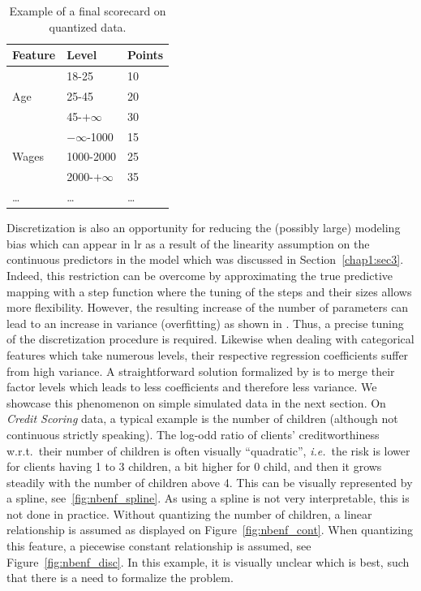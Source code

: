 \begin{table}
\centering
\caption{\label{tab:ex_scorecard} Example of a final scorecard on quantized data.}
\begin{tabular}{p{3cm}|p{3cm}|p{2cm}}
Feature & Level & Points \\
\hline
\hline
\multirow{3}{*}{Age} & 18-25 & 10 \\
 & 25-45 & 20 \\
 & 45-$+\infty$ & 30 \\
 \hline
\multirow{3}{*}{Wages} & $-\infty$-1000 & 15 \\
 & 1000-2000 & 25 \\
 & 2000-$+\infty$ & 35 \\
 \dots & \dots & \dots \\
\end{tabular}
\end{table}


Discretization is also an opportunity for reducing the (possibly large) modeling bias which can appear in \gls{lr} as a result of the linearity assumption on the continuous predictors in the model which was discussed in Section~\ref{chap1:sec3}. Indeed, this restriction can be overcome by approximating the true predictive mapping with a step function where the tuning of the steps and their sizes allows more flexibility. However, the resulting increase of the number of parameters can lead to an increase in variance (overfitting) as shown in \cite{yang2009discretization}. Thus, a precise tuning of the discretization procedure is required. Likewise when dealing with categorical features which take numerous levels, their respective regression coefficients suffer from high variance. A straightforward solution formalized by \cite{maj2015delete} is to merge their factor levels which leads to less coefficients and therefore less variance. We showcase this phenomenon on simple simulated data in the next section. On \textit{Credit Scoring} data, a typical example is the number of children (although not continuous strictly speaking). The log-odd ratio of clients' creditworthiness w.r.t.\ their number of children is often visually ``quadratic'', \textit{i.e.}\ the risk is lower for clients having 1 to 3 children, a bit higher for 0 child, and then it grows steadily with the number of children above 4. This can be visually represented by a spline, see~\ref{fig:nbenf_spline}. As using a spline is not very interpretable, this is not done in practice. Without quantizing the number of children, a linear relationship is assumed as displayed on Figure~\ref{fig:nbenf_cont}. When quantizing this feature, a piecewise constant relationship is assumed, see Figure~\ref{fig:nbenf_disc}. In this example, it is visually unclear which is best, such that there is a need to formalize the problem.

